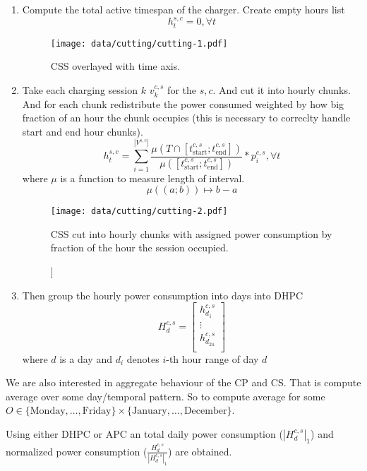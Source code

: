 \begin{enumerate}
    \item Compute the total active timespan of the charger. Create empty hours list \[h^{s,c}_t = 0, \forall t\]
          \begin{figure}[H]
              \texttt{[image: data/cutting/cutting-1.pdf]}
              \caption[todo]{\acrlong{CSS} overlayed with time axis.}
          \end{figure}
    \item Take each charging session $k$ $v^{c,s}_k$ for the $s,c$. And cut it into hourly chunks. And for each chunk redistribute the power consumed weighted by how big fraction of an hour the chunk occupies (this is necessary to correclty handle start and end hour chunks).
          \[
              h_t^{s,c} = \sum_{i = 1}^{|V^{s,c}|}
              \frac{
                  \mu(T \cap [t_{\text{start}}^{c,s}; t_{\text{end}}^{c,s}])
              }{
                  \mu([t_{\text{start}}^{c,s}; t_{\text{end}}^{c,s}])
              }
              *
              p_i^{c,s}, \forall t
          \]
          where $\mu$ is a function to measure length of interval. \[\mu((a;b)) \mapsto b - a\]
          \begin{figure}[H]
              \texttt{[image: data/cutting/cutting-2.pdf]}
              \caption[todo]]{\acrlong{CSS} cut into hourly chunks with assigned power consumption by fraction of the hour the session occupied.}
          \end{figure}
    \item Then group the hourly power consumption into days into \acrlong{DHPC}
          \[H_d^{c,s} =
              \begin{bmatrix}
                  h^{c,s}_{d_1}    \\
                  \vdots           \\
                  h^{c,s}_{d_{24}} \\
              \end{bmatrix}
          \] where $d$ is a day and $d_i$ denotes $i$-th hour range of day $d$
\end{enumerate}


We are also interested in aggregate behaviour of the \acrlong{CP} and \acrlong{CS}. That is compute average over some day/temporal pattern. So to compute average for some $O \in \{\text{Monday}, \dots, \text{Friday} \} \times \{ \text{January}, \dots, \text{December} \}$.

Using either \acrlong{DHPC} or \acrlong{APC} an total daily power consumption ($|H^{c,s}_{d}|_1$) and normalized power consumption ($\frac{H^{c,s}_d}{|H^{c,s}_d|_1}$) are obtained.



